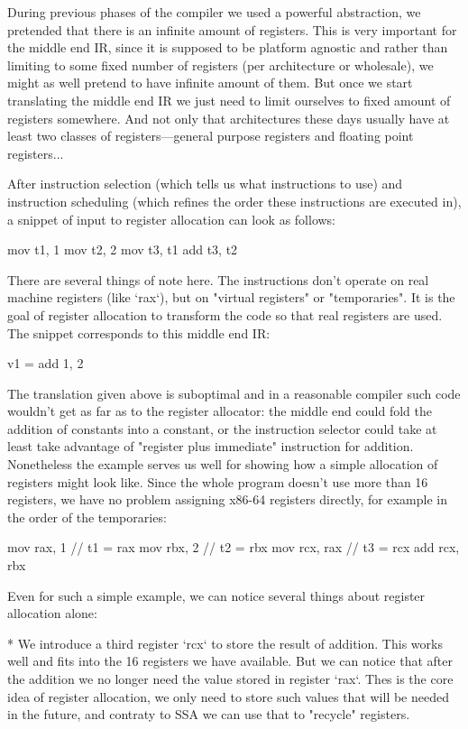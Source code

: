 During previous phases of the compiler we used a powerful abstraction, we
pretended that there is an infinite amount of registers. This is very important
for the middle end IR, since it is supposed to be platform agnostic and rather
than limiting to some fixed number of registers (per architecture or wholesale),
we might as well pretend to have infinite amount of them. But once we start
translating the middle end IR we just need to limit ourselves to fixed amount of
registers somewhere. And not only that architectures these days usually have at
least two classes of registers---general purpose registers and floating point
registers...

After instruction selection (which tells us what instructions to use) and
instruction scheduling (which refines the order these instructions are executed
in), a snippet of input to register allocation can look as follows:

\begtt
mov t1, 1
mov t2, 2
mov t3, t1
add t3, t2
\endtt

There are several things of note here. The instructions don't operate on real
machine registers (like `rax`), but on "virtual registers" or "temporaries". It
is the goal of register allocation to transform the code so that real registers
are used. The snippet corresponds to this middle end IR:

\begtt
v1 = add 1, 2
\endtt

The translation given above is suboptimal and in a reasonable compiler such code
wouldn't get as far as to the register allocator: the middle end could fold the
addition of constants into a constant, or the instruction selector could take at
least take advantage of "register plus immediate" instruction for addition.
Nonetheless the example serves us well for showing how a simple allocation of
registers might look like. Since the whole program doesn't use more than 16
registers, we have no problem assigning x86-64 registers directly, for example
in the order of the temporaries:

\begtt
mov rax, 1   // t1 = rax
mov rbx, 2   // t2 = rbx
mov rcx, rax // t3 = rcx
add rcx, rbx
\endtt

Even for such a simple example, we can notice several things about register
allocation alone:

\begitems
 * We introduce a third register `rcx` to store the result of addition. This
works well and fits into the 16 registers we have available. But we can notice
that after the addition we no longer need the value stored in register `rax`.
Thes is the core idea of register allocation, we only need to store such values
that will be needed in the future, and contraty to SSA we can use that to
"recycle" registers.

